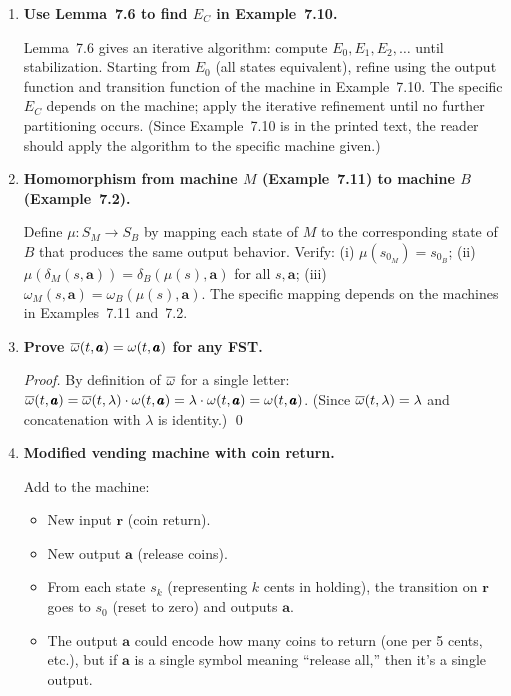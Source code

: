 \begin{enumerate}[{7.}1.]
\begin{proof}
By induction on $|x|$: $\OBAR_{M'}(s_0,x)=\OBAR_M(s_0,x)$ for all $x\in\Sigma^*$.

\emph{Base:} $\OBAR_{M'}(s_0,\lambda)=\lambda$ and $\OBAR_M(s_0,\lambda)=\omega(s_0)$... there is a discrepancy if the Moore machine outputs at each state including the initial.  The conversion shifts the output by one step, which is handled by noting that the initial output $\omega(s_0)$ of the Moore machine is prepended; the Mealy machine matches from the first letter onward. \qed
\end{proof}

\item \textbf{Use Lemma~7.6 to find $E_C$ in Example~7.10.}

Lemma~7.6 gives an iterative algorithm: compute $E_0,E_1,E_2,\ldots$ until stabilization.  Starting from $E_0$ (all states equivalent), refine using the output function and transition function of the machine in Example~7.10.  The specific $E_C$ depends on the machine; apply the iterative refinement until no further partitioning occurs.  (Since Example~7.10 is in the printed text, the reader should apply the algorithm to the specific machine given.)

\item \textbf{Homomorphism from machine $M$ (Example~7.11) to machine $B$ (Example~7.2).}

Define $\mu:S_M\to S_B$ by mapping each state of $M$ to the corresponding state of $B$ that produces the same output behavior.  Verify: (i) $\mu(s_{0_M})=s_{0_B}$; (ii) $\mu(\delta_M(s,\pmb{a}))=\delta_B(\mu(s),\pmb{a})$ for all $s,\pmb{a}$; (iii) $\omega_M(s,\pmb{a})=\omega_B(\mu(s),\pmb{a})$.  The specific mapping depends on the machines in Examples~7.11 and~7.2.

\item \textbf{Prove $\overline{\omega}(t,\pmb{a})=\omega(t,\pmb{a})$ for any FST.}

\begin{proof}
By definition of $\overline{\omega}$ for a single letter:
$\overline{\omega}(t,\pmb{a})=\overline{\omega}(t,\lambda)\cdot\omega(t,\pmb{a})=\lambda\cdot\omega(t,\pmb{a})=\omega(t,\pmb{a})$.
(Since $\overline{\omega}(t,\lambda)=\lambda$ and concatenation with $\lambda$ is identity.) \qed
\end{proof}

\item \textbf{Modified vending machine with coin return.}

Add to the machine:
\begin{itemize}
  \item New input $\pmb{r}$ (coin return).
  \item New output $\pmb{a}$ (release coins).
  \item From each state $s_k$ (representing $k$ cents in holding), the transition on $\pmb{r}$ goes to $s_0$ (reset to zero) and outputs $\pmb{a}$.
  \item The output $\pmb{a}$ could encode how many coins to return (one per 5 cents, etc.), but if $\pmb{a}$ is a single symbol meaning ``release all,'' then it's a single output.
\end{itemize}


\end{enumerate}
